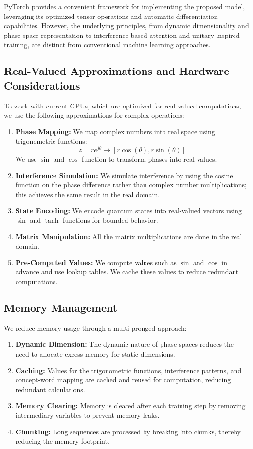 \documentclass[11pt, a4paper]{article}
\begin{document}
PyTorch provides a convenient framework for implementing the proposed model, leveraging its optimized tensor operations and automatic differentiation capabilities. However, the underlying principles, from dynamic dimensionality and phase space representation to interference-based attention and unitary-inspired training, are distinct from conventional machine learning approaches.

\subsection{Real-Valued Approximations and Hardware Considerations}

To work with current GPUs, which are optimized for real-valued computations, we use the following approximations for complex operations:
\begin{enumerate}
    \item \textbf{Phase Mapping:} We map complex numbers into real space using trigonometric functions:
        $$
        z = r e^{j\theta} \rightarrow [r\cos(\theta), r\sin(\theta)]
        $$
    We use $\sin$ and $\cos$ function to transform phases into real values.
    \item \textbf{Interference Simulation:} We simulate interference by using the cosine function on the phase difference rather than complex number multiplications; this achieves the same result in the real domain.
    \item \textbf{State Encoding:} We encode quantum states into real-valued vectors using $\sin$ and $\tanh$ functions for bounded behavior.
    \item \textbf{Matrix Manipulation:} All the matrix multiplications are done in the real domain.
    \item \textbf{Pre-Computed Values:} We compute values such as $\sin$ and $\cos$ in advance and use lookup tables. We cache these values to reduce redundant computations.
\end{enumerate}

\subsection{Memory Management}

We reduce memory usage through a multi-pronged approach:
\begin{enumerate}
    \item \textbf{Dynamic Dimension:} The dynamic nature of phase spaces reduces the need to allocate excess memory for static dimensions.
    \item \textbf{Caching:} Values for the trigonometric functions, interference patterns, and concept-word mapping are cached and reused for computation, reducing redundant calculations.
    \item \textbf{Memory Clearing:} Memory is cleared after each training step by removing intermediary variables to prevent memory leaks.
    \item \textbf{Chunking:} Long sequences are processed by breaking into chunks, thereby reducing the memory footprint.
\end{enumerate}
\end{document}
